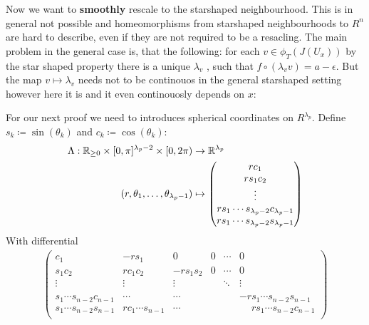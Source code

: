 Now we want to \textbf{smoothly} rescale to the starshaped neighbourhood. This is in general not possible and homeomorphisms from starshaped neighbourhoods to $R^n$ are hard to describe, even if they are not required to be a resacling. The main problem in the general case is, that the following: for each $v\in \phi_T(J(U_x))$ by the star shaped property there is a unique $\lambda_v$ ,  such that $f\circ (\lambda_v v)=a-\epsilon$. But the map $v\mapsto \lambda_v$ needs not to be continouos in the general starshaped setting however here it is and it even continouosly depends on $x$:
\begin{definition}
	For our next proof we need to introduces spherical coordinates on $R^{\lambda_{p}}$. Define $s_k\coloneq \sin(\theta_k)$ and $c_k\coloneq \cos(\theta_k)$:
	\begin{align*}
		\Lambda: \mathbb{R}_{\geq 0}\times [0,\pi]^{\lambda_{p}-2}\times [0,2\pi)&\to \mathbb{R}^{\lambda_p}  \\
		(r,\theta_1,\dots, \theta_{\lambda_p-1})&\mapsto \begin{pmatrix}
			rc_1\\
			rs_1c_2\\
			\vdots  \\
			rs_1 \cdots s_{\lambda_{p}-2} c_{\lambda_{p}-1} \\
			rs_1 \cdots s_{\lambda_{p}-2} s_{\lambda_{p}-1}		
		\end{pmatrix}
	\end{align*}
	With differential 
	\begin{align*}
		\begin{pmatrix} 
			c_1                        &-rs_1              &0        &0 &\cdots &0      \\
			s_1c_2                     &rc_1c_2            &-rs_1s_2 &0 &\cdots &0      \\
			\vdots                     &\vdots             & \vdots  &  &\ddots &\vdots \\
			&                   &         &  &             \\
			s_1\cdots s_{n-2}c_{n-1}   &\cdots             &\cdots   &  &       &-rs_1\cdots s_{n-2}s_{n-1} \\
			s_{1}\cdots s_{n-2}s_{n-1} &rc_1\cdots s_{n-1} &\cdots   &  &       &\phantom{-}rs_1\cdots s_{n-2}c_{n-1}\\
		\end{pmatrix}
	\end{align*}
	
\end{definition}

